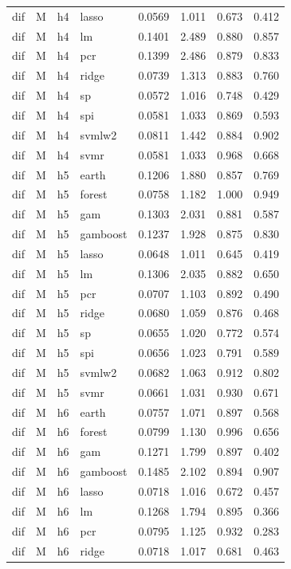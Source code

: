 \begin{ThreePartTable}
\begin{longtable}[t]{llclcccc}
dif & M & h4 & lasso & 0.0569 & 1.011 & 0.673 & 0.412\\
dif & M & h4 & lm & 0.1401 & 2.489 & 0.880 & 0.857\\
dif & M & h4 & pcr & 0.1399 & 2.486 & 0.879 & 0.833\\
dif & M & h4 & ridge & 0.0739 & 1.313 & 0.883 & 0.760\\
dif & M & h4 & sp & 0.0572 & 1.016 & 0.748 & 0.429\\
dif & M & h4 & spi & 0.0581 & 1.033 & 0.869 & 0.593\\
dif & M & h4 & svmlw2 & 0.0811 & 1.442 & 0.884 & 0.902\\
dif & M & h4 & svmr & 0.0581 & 1.033 & 0.968 & 0.668\\
\addlinespace
dif & M & h5 & earth & 0.1206 & 1.880 & 0.857 & 0.769\\
dif & M & h5 & forest & 0.0758 & 1.182 & 1.000 & 0.949\\
dif & M & h5 & gam & 0.1303 & 2.031 & 0.881 & 0.587\\
dif & M & h5 & gamboost & 0.1237 & 1.928 & 0.875 & 0.830\\
dif & M & h5 & lasso & 0.0648 & 1.011 & 0.645 & 0.419\\
dif & M & h5 & lm & 0.1306 & 2.035 & 0.882 & 0.650\\
dif & M & h5 & pcr & 0.0707 & 1.103 & 0.892 & 0.490\\
dif & M & h5 & ridge & 0.0680 & 1.059 & 0.876 & 0.468\\
dif & M & h5 & sp & 0.0655 & 1.020 & 0.772 & 0.574\\
dif & M & h5 & spi & 0.0656 & 1.023 & 0.791 & 0.589\\
dif & M & h5 & svmlw2 & 0.0682 & 1.063 & 0.912 & 0.802\\
dif & M & h5 & svmr & 0.0661 & 1.031 & 0.930 & 0.671\\
\addlinespace
dif & M & h6 & earth & 0.0757 & 1.071 & 0.897 & 0.568\\
dif & M & h6 & forest & 0.0799 & 1.130 & 0.996 & 0.656\\
dif & M & h6 & gam & 0.1271 & 1.799 & 0.897 & 0.402\\
dif & M & h6 & gamboost & 0.1485 & 2.102 & 0.894 & 0.907\\
dif & M & h6 & lasso & 0.0718 & 1.016 & 0.672 & 0.457\\
dif & M & h6 & lm & 0.1268 & 1.794 & 0.895 & 0.366\\
dif & M & h6 & pcr & 0.0795 & 1.125 & 0.932 & 0.283\\
dif & M & h6 & ridge & 0.0718 & 1.017 & 0.681 & 0.463\\

\end{longtable}
\end{ThreePartTable}
